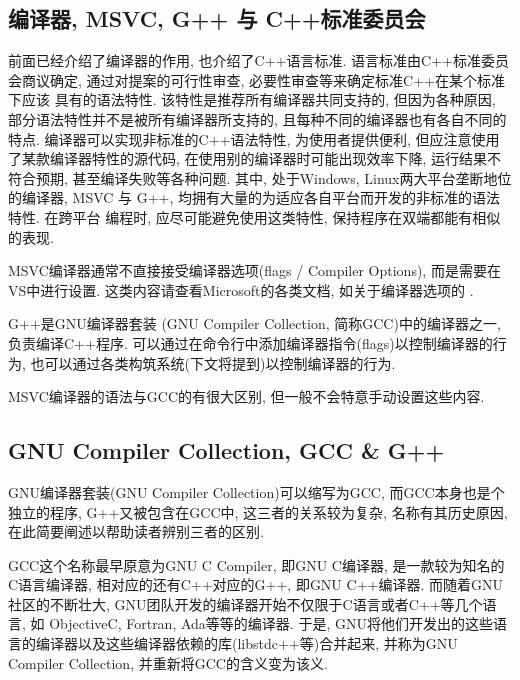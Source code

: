 \subsection{编译器, MSVC, G++ 与 C++标准委员会}
前面已经介绍了编译器的作用, 也介绍了C++语言标准. 语言标准由C++标准委员会商议确定, 通过对提案的可行性审查, 必要性审查等来确定标准C++在某个标准下应该
具有的语法特性. 该特性是推荐所有编译器共同支持的, 但因为各种原因, 部分语法特性并不是被所有编译器所支持的, 且每种不同的编译器也有各自不同的特点.
编译器可以实现非标准的C++语法特性, 为使用者提供便利, 但应注意使用了某款编译器特性的源代码, 在使用别的编译器时可能出现效率下降, 运行结果不符合预期,
甚至编译失败等各种问题. 其中, 处于Windows, Linux两大平台垄断地位的编译器, MSVC 与 G++, 均拥有大量的为适应各自平台而开发的非标准的语法特性. 在跨平台
编程时, 应尽可能避免使用这类特性, 保持程序在双端都能有相似的表现.

MSVC编译器通常不直接接受编译器选项(flags / Compiler Options), 而是需要在VS中进行设置. 这类内容请查看Microsoft的各类文档, 如关于编译器选项的
.

G++是GNU编译器套装 (GNU Compiler Collection, 简称GCC)中的编译器之一, 负责编译C++程序. 可以通过在命令行中添加编译器指令(flags)以控制编译器的行为,
也可以通过各类构筑系统(下文将提到)以控制编译器的行为.

MSVC编译器的语法与GCC的有很大区别, 但一般不会特意手动设置这些内容.

\subsection{GNU Compiler Collection, GCC \& G++}
GNU编译器套装(GNU Compiler Collection)可以缩写为GCC, 而GCC本身也是个独立的程序, G++又被包含在GCC中, 这三者的关系较为复杂, 名称有其历史原因,
在此简要阐述以帮助读者辨别三者的区别.

GCC这个名称最早原意为GNU C Compiler, 即GNU C编译器, 是一款较为知名的C语言编译器, 相对应的还有C++对应的G++, 即GNU C++编译器.
而随着GNU社区的不断壮大, GNU团队开发的编译器开始不仅限于C语言或者C++等几个语言, 如 Objective\-C, Fortran, Ada等等的编译器. 于是,
GNU将他们开发出的这些语言的编译器以及这些编译器依赖的库(libstdc++等)合并起来, 并称为GNU Compiler Collection, 并重新将GCC的含义变为该义.

